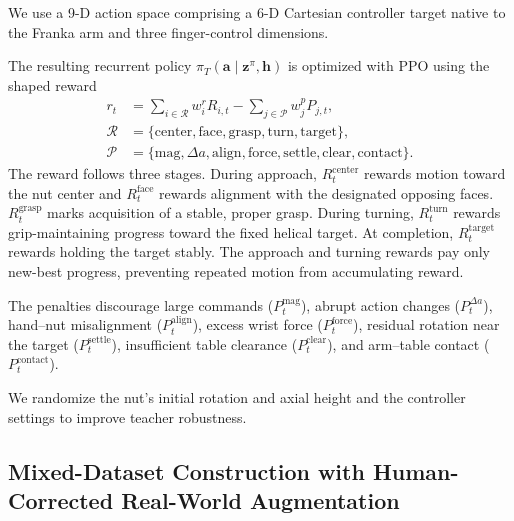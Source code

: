 We use a 9-D action space comprising a 6-D Cartesian controller target native
to the Franka arm and three finger-control dimensions.

The resulting recurrent policy
$\pi_T(\mathbf{a}\mid\mathbf{z}^{\pi},\mathbf{h})$ is optimized with PPO using
the shaped reward
\begin{equation}
  \begin{aligned}
  r_t &= \sum_{i\in\mathcal{R}} w_i^rR_{i,t}
         -\sum_{j\in\mathcal{P}} w_j^pP_{j,t},\\
  \mathcal{R} &= \{\mathrm{center,face,grasp,turn,target}\},\\
  \mathcal{P} &= \{\mathrm{mag},\Delta a,\mathrm{align},\mathrm{force},
  \mathrm{settle},\mathrm{clear},\mathrm{contact}\}.
  \end{aligned}
  \label{eq:teacher_reward}
\end{equation}
The reward follows three stages. During approach,
$R_t^{\mathrm{center}}$ rewards motion toward the nut center and
$R_t^{\mathrm{face}}$ rewards alignment with the designated opposing faces.
$R_t^{\mathrm{grasp}}$ marks acquisition of a stable, proper grasp. During
turning, $R_t^{\mathrm{turn}}$ rewards grip-maintaining progress toward the
fixed helical target. At completion, $R_t^{\mathrm{target}}$ rewards holding
the target stably. The approach and turning rewards pay only new-best progress,
preventing repeated motion from accumulating reward.

The penalties discourage large commands ($P_t^{\mathrm{mag}}$), abrupt action
changes ($P_t^{\Delta a}$), hand--nut misalignment ($P_t^{\mathrm{align}}$),
excess wrist force ($P_t^{\mathrm{force}}$), residual rotation near the target
($P_t^{\mathrm{settle}}$), insufficient table clearance
($P_t^{\mathrm{clear}}$), and arm--table contact ($P_t^{\mathrm{contact}}$).

We randomize the nut's initial rotation and axial height and the controller
settings to improve teacher robustness.

\subsection{Mixed-Dataset Construction with Human-Corrected
Real-World Augmentation}

